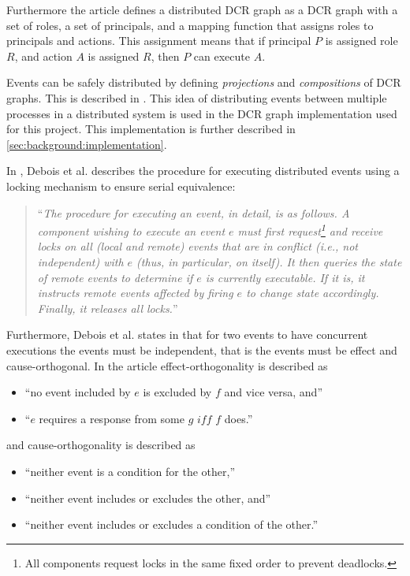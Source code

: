 	Furthermore the article defines a distributed DCR graph as a DCR graph with a set of roles, a set of principals, and a mapping function that assigns roles to principals and actions. This assignment means that if principal $P$ is assigned role $R$, and action $A$ is assigned $R$, then $P$ can execute $A$.
		
	\newpar
	Events can be safely distributed by defining \textit{projections} and \textit{compositions} of DCR graphs. This is described in \cite{hildebrandt2011safe}. This idea of distributing events between multiple processes in a distributed system is used in the DCR graph implementation used for this project. This implementation is further described in \autoref{sec:background:implementation}. 
    
	\newpar 
	In \cite{debois2015concurrency}, Debois et al. describes the procedure for executing distributed events using a locking mechanism to ensure serial equivalence:
	
	\begin{quotation}
		``\textit{The procedure for executing an event, in detail, is as follows. A component
		wishing to execute an event $e$ must first request\footnote{All components request locks in the same fixed order to prevent deadlocks.} and receive locks on all (local
		and remote) events that are in conflict (i.e., not independent) with $e$ (thus, in
		particular, on itself). It then queries the state of remote events to determine if
		$e$ is currently executable. If it is, it instructs remote events affected by firing $e$
		to change state accordingly. Finally, it releases all locks.}''
	\end{quotation}
	
	 \noindent Furthermore, Debois et al. states in \cite{debois2015concurrency} that for two events to have concurrent executions the events must be independent, that is the events must be effect and cause-orthogonal. In the article effect-orthogonality is described as
	\begin{itemize}
		\item ``no event included by $e$ is excluded by $f$ and vice versa, and''
		\item ``$e$ requires a response from some $g$ $iff$ $f$ does.''
	\end{itemize}
	
	\noindent and cause-orthogonality is described as
	\begin{itemize}
		\item ``neither event is a condition for the other,''
		\item ``neither event includes or excludes the other, and''
		\item ``neither event includes or excludes a condition of the other.''
	\end{itemize}

